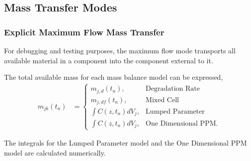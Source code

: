 \subsection{Mass Transfer Modes}\label{sec:mass_transfer}





\subsubsection{Explicit Maximum Flow Mass Transfer}\label{sed:max_flow_mass_transfer}

For debugging and testing purposes, the maximum flow mode transports all 
available material in a component into the component external to it. 

The total available mass for each mass balance model can be expressed,
\begin{align}
m_{jk}(t_n) &= \begin{cases}
                         m_{j,d}(t_n), & \mbox{Degradation Rate}\\
                         m_{j,df}(t_n), & \mbox{Mixed Cell}\\
                         \int C(z,t_n)dV_j, & \mbox{Lumped Parameter}\\
                         \int C(z,t_n)dV_j, & \mbox{One Dimensional PPM}.
               \end{cases}
\end{align}

The integrals for the Lumped Parameter model and the One Dimensional PPM model 
are calculated numerically.


